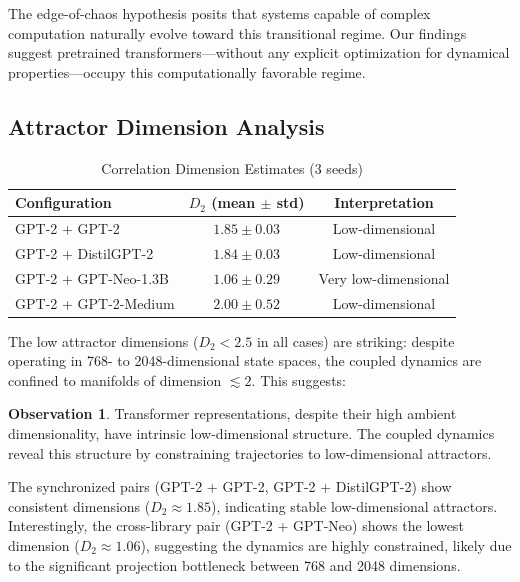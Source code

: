 \documentclass[10pt]{article} %
\theoremstyle{plain}
\theoremstyle{definition}
\newtheorem{observation}[theorem]{Observation}
\theoremstyle{remark}
\begin{document}
The edge-of-chaos hypothesis \cite{langton1990computation,packard1988adaptation} posits that systems capable of complex computation naturally evolve toward this transitional regime. Our findings suggest pretrained transformers---without any explicit optimization for dynamical properties---occupy this computationally favorable regime.

\subsection{Attractor Dimension Analysis}

\begin{table}[htbp]
\centering
\caption{Correlation Dimension Estimates (3 seeds)}
\label{tab:attractor}
\small
\begin{tabular}{lcc}
\toprule
\textbf{Configuration} & \textbf{$D_2$ (mean $\pm$ std)} & \textbf{Interpretation} \\
\midrule
GPT-2 + GPT-2 & $1.85 \pm 0.03$ & Low-dimensional \\
GPT-2 + DistilGPT-2 & $1.84 \pm 0.03$ & Low-dimensional \\
GPT-2 + GPT-Neo-1.3B & $1.06 \pm 0.29$ & Very low-dimensional \\
GPT-2 + GPT-2-Medium & $2.00 \pm 0.52$ & Low-dimensional \\
\bottomrule
\end{tabular}
\end{table}

The low attractor dimensions ($D_2 < 2.5$ in all cases) are striking: despite operating in 768- to 2048-dimensional state spaces, the coupled dynamics are confined to manifolds of dimension $\lesssim 2$. This suggests:

\begin{observation}
Transformer representations, despite their high ambient dimensionality, have intrinsic low-dimensional structure. The coupled dynamics reveal this structure by constraining trajectories to low-dimensional attractors.
\end{observation}

The synchronized pairs (GPT-2 + GPT-2, GPT-2 + DistilGPT-2) show consistent dimensions ($D_2 \approx 1.85$), indicating stable low-dimensional attractors. Interestingly, the cross-library pair (GPT-2 + GPT-Neo) shows the lowest dimension ($D_2 \approx 1.06$), suggesting the dynamics are highly constrained, likely due to the significant projection bottleneck between 768 and 2048 dimensions.
\end{document}
